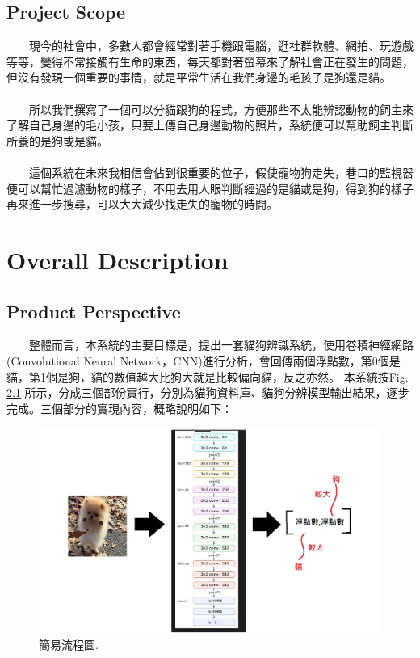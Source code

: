 \documentclass{scrreprt}
\begin{document}
\begin{CJK*}{UTF8}{bsmi}
\section{Project Scope}
　　現今的社會中，多數人都會經常對著手機跟電腦，逛社群軟體、網拍、玩遊戲等等，變得不常接觸有生命的東西，每天都對著螢幕來了解社會正在發生的問題，但沒有發現一個重要的事情，就是平常生活在我們身邊的毛孩子是狗還是貓。\\
	\\
　　所以我們撰寫了一個可以分貓跟狗的程式，方便那些不太能辨認動物的飼主來了解自己身邊的毛小孩，只要上傳自己身邊動物的照片，系統便可以幫助飼主判斷所養的是狗或是貓。\\
	\\
　　這個系統在未來我相信會佔到很重要的位子，假使寵物狗走失，巷口的監視器便可以幫忙過濾動物的樣子，不用去用人眼判斷經過的是貓或是狗，得到狗的樣子再來進一步搜尋，可以大大減少找走失的寵物的時間。\\



\chapter{Overall Description}

\section{Product Perspective}
　　整體而言，本系統的主要目標是，提出一套貓狗辨識系統，使用卷積神經網路(Convolutional Neural Network，CNN)進行分析，會回傳兩個浮點數，第0個是貓，第1個是狗，貓的數值越大比狗大就是比較偏向貓，反之亦然。
本系統按Fig.\,\ref{fig:2.1} 所示，分成三個部份實行，分別為貓狗資料庫、貓狗分辨模型輸出結果，逐步完成。三個部分的實現內容，概略說明如下：\\
\begin{figure}[h]
\begin{center}
\includegraphics[width=12cm]{Fig.jpg} 
\end{center} 
\label{fig:2.1} 
\caption{簡易流程圖.} 
\end{figure}


\end{CJK*}
\end{document}
